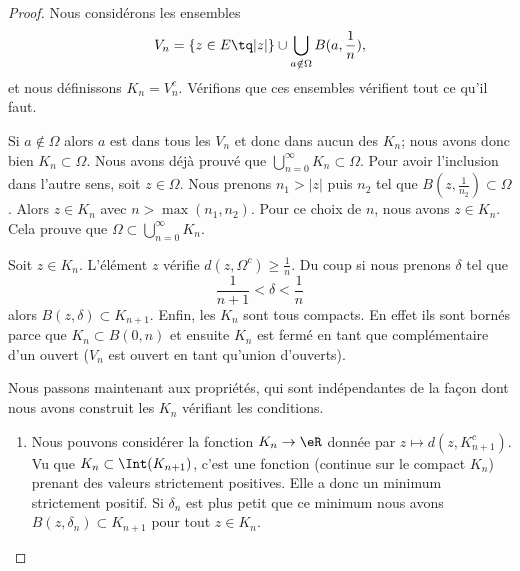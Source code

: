 \begin{proof}
	Nous considérons les ensembles
	\begin{equation}
		V_n=\{ z\in E\tq | z | \}\cup\bigcup_{a\notin\Omega}B(a,\frac{1}{ n }),
	\end{equation}
	et nous définissons \( K_n=V_n^c\). Vérifions que ces ensembles vérifient tout ce qu'il faut.
	\begin{subproof}
		Si \( a\notin\Omega\) alors \( a\) est dans tous les \( V_n\) et donc dans aucun des \( K_n\); nous avons donc bien \( K_n\subset\Omega\).
		\spitem[\( \bigcup_{n=0}^{\infty}K_n=\Omega\)]
		Nous avons déjà prouvé que \( \bigcup_{n=0}^{\infty}K_n\subset \Omega\). Pour avoir l'inclusion dans l'autre sens, soit \( z\in \Omega\). Nous prenons \( n_1>| z |\) puis \( n_2\) tel que \( B(z,\frac{1}{ n_2 })\subset \Omega\). Alors \( z\in K_n\) avec \( n>\max(n_1,n_2)\). Pour ce choix de \( n\), nous avons  \( z\in K_n\). Cela prouve que \( \Omega\subset \bigcup_{n=0}^{\infty}K_n\).

		Soit \( z\in K_n\). L'élément \( z\) vérifie \( d(z,\Omega^c)\geq \frac{1}{ n }\). Du coup si nous prenons \( \delta\) tel que
		\begin{equation}
			\frac{1}{ n+1 }<\delta<\frac{1}{ n }
		\end{equation}
		alors \( B(z,\delta)\subset K_{n+1}\).
		Enfin, les \( K_n\) sont tous compacts. En effet ils sont bornés parce que \( K_n\subset B(0,n)\) et ensuite \( K_n\) est fermé en tant que complémentaire d'un ouvert (\( V_n\) est ouvert en tant qu'union d'ouverts).
	\end{subproof}

	Nous passons maintenant aux propriétés, qui sont indépendantes de la façon dont nous avons construit les \( K_n\) vérifiant les conditions.
	\begin{enumerate}
		\item

		      Nous pouvons considérer la fonction \( K_n\to \eR\) donnée par \( z\mapsto d(z, K_{n+1}^c)\). Vu que \( K_n\subset\Int(K_{n+1})\), c'est une fonction (continue sur le compact \( K_n\)) prenant des valeurs strictement positives. Elle a donc un minimum strictement positif. Si \( \delta_n\) est plus petit que ce minimum nous avons \( B(z,\delta_n)\subset K_{n+1}\) pour tout \( z\in K_n\).


\end{enumerate}
\end{proof}
